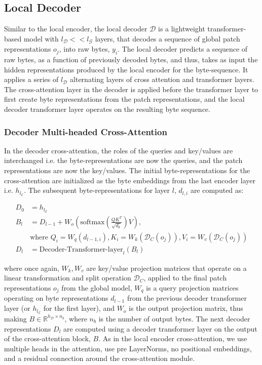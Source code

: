 \documentclass[]{fairmeta}
\begin{document}
\subsection{Local Decoder} 

Similar to the local encoder, the local decoder  $\mathcal{D}$ is a lightweight transformer-based model with $l_{\mathcal{D}} << l_{\mathcal{G}}$ layers, that decodes a sequence of global patch representations $o_j$, into raw bytes, $y_i$. The local decoder predicts a sequence of raw bytes, as a function of previously decoded bytes, and thus, takes as input the hidden representations produced by the local encoder for the byte-sequence.
It applies a series of $l_{\mathcal{D}}$ alternating layers of cross attention and transformer layers. The cross-attention layer in the decoder is applied before the transformer layer to first create byte representations from the patch representations, and the local decoder transformer layer operates on the resulting byte sequence. 

\subsubsection{Decoder Multi-headed Cross-Attention} 

In the decoder cross-attention, the roles of the queries and key/values are interchanged i.e. the byte-representations are now the queries, and the patch representations are now the key/values. The initial byte-representations for the cross-attention are initialized as the byte embeddings from the last encoder layer i.e. $h_{l_{\mathcal{E}}}$. The subsequent byte-representations for layer $l$, $d_{l,i}$ are computed as:

\begin{align}
D_0 &= h_{l_{\mathcal{E}}} \\
B_l &= D_{l-1} + W_o\left(\text{softmax}\left(\frac{QK^T}{\sqrt{d_k}}\right)V\right), \\
  &\text{where } Q_i = W_q(d_{l-1,i}), K_i = W_k(\mathcal{D}_C(o_j)), V_i = W_v(\mathcal{D}_C(o_j)) \\
  D_l &= \text{Decoder-Transformer-layer}_l(B_l)
\end{align}

where once again, $W_k, W_v$ are key/value projection matrices that operate on a linear transformation and split operation $\mathcal{D}_C$, applied to the final patch representations $o_j$ from the global model, $W_q$ is a query projection matrices operating on byte representations $d_{l-1}$ from the previous decoder transformer layer (or $h_{l_{\mathcal{E}}}$ for the first layer), and $W_o$ is the output projection matrix, thus making $B \in \mathbb{R}^{h_{\mathcal{D}} \times n_b}$, where $n_b$ is the number of output bytes. The next decoder representations $D_l$ are computed using a decoder transformer layer on the output of the cross-attention block, $B$. As in the local encoder cross-attention, we use multiple heads in the attention, use pre LayerNorms, no positional embeddings, and a residual connection around the cross-attention module. 
\end{document}
